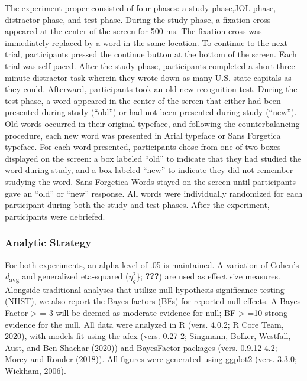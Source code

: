 \documentclass[
  english,
  man]{apa6}
\begin{document}
The experiment proper consisted of four phases: a study phase,JOL phase, distractor phase, and test phase. During the study phase, a fixation cross appeared at the center of the screen for 500 ms. The fixation cross was immediately replaced by a word in the same location. To continue to the next trial, participants pressed the continue button at the bottom of the screen. Each trial was self-paced. After the study phase, participants completed a short three-minute distractor task wherein they wrote down as many U.S. state capitals as they could. Afterward, participants took an old-new recognition test. During the test phase, a word appeared in the center of the screen that either had been presented during study (\enquote{old}) or had not been presented during study (\enquote{new}). Old words occurred in their original typeface, and following the counterbalancing procedure, each new word was presented in Arial typeface or Sans Forgetica typeface. For each word presented, participants chose from one of two boxes displayed on the screen: a box labeled \enquote{old} to indicate that they had studied the word during study, and a box labeled \enquote{new} to indicate they did not remember studying the word. Sans Forgetica Words stayed on the screen until participants gave an \enquote{old} or \enquote{new} response. All words were individually randomized for each participant during both the study and test phases. After the experiment, participants were debriefed.

\hypertarget{analytic-strategy}{%
\subsubsection{Analytic Strategy}\label{analytic-strategy}}

For both experiments, an alpha level of .05 is maintained. A variation of Cohen's \emph{d}\textsubscript{avg} and generalized eta-squared (\(\eta_{g}^{2}\)\}; {\textbf{???}}) are used as effect size measures. Alongside traditional analyses that utilize null hypothesis significance testing (NHST), we also report the Bayes factors (BFs) for reported null effects. A Bayes Factor \textgreater{} = 3 will be deemed as moderate evidence for null; BF \textgreater{} =10 strong evidence for the null. All data were analyzed in R (vers. 4.0.2; R Core Team, 2020), with models fit using the afex (vers. 0.27-2; Singmann, Bolker, Westfall, Aust, and Ben-Shachar (2020)) and BayesFactor packages (vers. 0.9.12-4.2; Morey and Rouder (2018)). All figures were generated using ggplot2 (vers. 3.3.0; Wickham, 2006).
\end{document}
